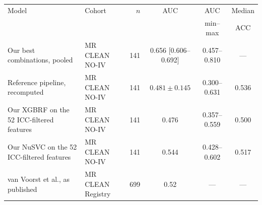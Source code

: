 {\footnotesize\setlength{\tabcolsep}{2pt}%
\begin{tabular}{>{\raggedright\arraybackslash}p{}>{\raggedright\arraybackslash}p{}rccc}
\toprule
Model & Cohort & $n$ & AUC & AUC & Median \\
 &  &  &  & min--max & ACC \\
\midrule
Our best combinations, pooled & MR CLEAN NO-IV & 141 & 0.656 [0.606--0.692] & 0.457--0.810 & --- \\
\addlinespace
Reference pipeline, recomputed & MR CLEAN NO-IV & 141 & $0.481 \pm 0.145$ & 0.300--0.631 & 0.536 \\
\addlinespace
Our XGBRF on the 52 ICC-filtered features & MR CLEAN NO-IV & 141 & 0.476 & 0.357--0.559 & 0.500 \\
\addlinespace
Our NuSVC on the 52 ICC-filtered features & MR CLEAN NO-IV & 141 & 0.544 & 0.428--0.602 & 0.517 \\
\addlinespace
van Voorst et al., as published & MR CLEAN Registry & 699 & 0.52 & --- & --- \\
\bottomrule
\end{tabular}}
